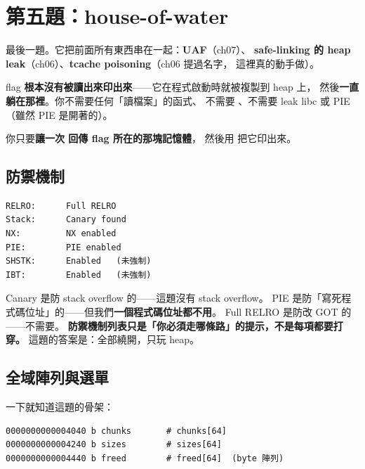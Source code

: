 \section{第五題：house-of-water}
\label{chap:house}

最後一題。它把前面所有東西串在一起：\textbf{UAF}（ch07）、
\textbf{safe-linking 的 heap leak}（ch06）、\textbf{tcache poisoning}（ch06 提過名字，
這裡真的動手做）。

\begin{keybox}[先講這一題最有趣的地方]
flag \textbf{根本沒有被讀出來印出來}——它在程式啟動時就被複製到 heap 上，
然後\textbf{一直躺在那裡}。你不需要任何「讀檔案」的函式、
不需要 、不需要 leak libc 或 PIE
（雖然 PIE 是開著的）。

你只要\textbf{讓一次  回傳 flag 所在的那塊記憶體}，
然後用  把它印出來。
\end{keybox}

\subsection{防禦機制}

\begin{lstlisting}[style=raw]
RELRO:      Full RELRO
Stack:      Canary found
NX:         NX enabled
PIE:        PIE enabled
SHSTK:      Enabled   (未強制)
IBT:        Enabled   (未強制)
\end{lstlisting}

\begin{keybox}
Canary 是防 stack overflow 的——這題沒有 stack overflow。
PIE 是防「寫死程式碼位址」的——但我們\textbf{一個程式碼位址都不用}。
Full RELRO 是防改 GOT 的——不需要。
\textbf{防禦機制列表只是「你必須走哪條路」的提示，不是每項都要打穿。}
這題的答案是：全部繞開，只玩 heap。
\end{keybox}

\subsection{全域陣列與選單}

 一下就知道這題的骨架：

\begin{lstlisting}[style=raw]
0000000000004040 b chunks       # chunks[64]
0000000000004240 b sizes        # sizes[64]
0000000000004440 b freed        # freed[64]  (byte 陣列)
\end{lstlisting}

